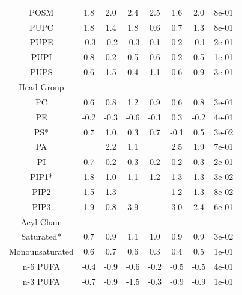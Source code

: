 \documentclass[9pt]{article}
\begin{document}
\begin{table}
{\begin{tabular}{| c || ccccc |cc|}
POSM    &            1.8 &         2.0 &          2.4 &            2.5 &          1.6 &  2.0 &  8e-01 \\
PUPC    &            1.8 &         1.4 &          1.8 &            0.6 &          0.7 &  1.3 &  8e-01 \\
PUPE    &           -0.3 &        -0.2 &         -0.3 &            0.1 &          0.2 & -0.1 &  2e-01 \\
PUPI    &            0.8 &         0.2 &          0.5 &            0.6 &          0.2 &  0.5 &  1e-01 \\
PUPS    &            0.6 &         1.5 &          0.4 &            1.1 &          0.6 &  0.9 &  3e-01 \\
        \hline
Head Group &&&&&&&\\
PC      &            0.6 &         0.8 &          1.2 &            0.9 &          0.6 &  0.8  & 3e-01 \\
PE      &           -0.2 &        -0.3 &         -0.6 &           -0.1 &          0.3 & -0.2 &  4e-01 \\
PS*      &            0.7 &         1.0 &          0.3 &            0.7 &         -0.1 &  0.5 &  3e-02 \\
PA      &             &         2.2 &          1.1 &             &          2.5 &  1.9 &  7e-01 \\
PI      &            0.7 &         0.2 &          0.3 &            0.2 &          0.2 &  0.3 &  2e-01 \\
PIP1*     &            1.8 &         1.0 &          1.1 &            1.2 &          1.3 &  1.3 &  3e-02 \\
PIP2     &            1.5 &         1.3 &           &             &          1.2 &  1.3 &  8e-02 \\
PIP3     &            1.9 &         0.8 &          3.9 &             &          3.0 &  2.4 &  6e-01 \\
        \hline
Acyl Chain &&&&&&&\\
Saturated*      &            0.7 &         0.9 &          1.1 &            1.0 &          0.9 &  0.9 &  3e-02 \\
Monounsaturated      &            0.6 &         0.7 &          0.6 &            0.3 &          0.4 &  0.5 &  1e-01 \\
n-6 PUFA      &           -0.4 &        -0.9 &         -0.6 &           -0.2 &         -0.5 & -0.5 &  4e-01 \\
n-3 PUFA      &           -0.7 &        -0.9 &         -1.5 &           -0.3 &         -0.9 & -0.9 &  1e-01 \\

\end{tabular}}
\end{table}
\end{document}
